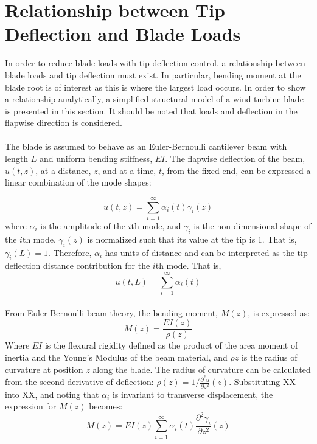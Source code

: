 \section{Relationship between Tip Deflection and Blade Loads}
In order to reduce blade loads with tip deflection control, a relationship between blade loads and tip deflection must exist. In particular, bending moment at the blade root is of interest as this is where the largest load occurs. In order to show a relationship analytically, a simplified structural model of a wind turbine blade is presented in this section. It should be noted that loads and deflection in the flapwise direction is considered. 
\\~\\
The blade is assumed to behave as an Euler-Bernoulli cantilever beam with length $L$ and uniform bending stiffness, $EI$. The flapwise deflection of the beam, $u(t, z)$, at a distance, $z$, and at a time, $t$, from the fixed end, can be expressed a linear combination of the mode shapes:

\begin{equation}
    u(t, z) = \sum_{i=1}^\infty \alpha_i(t) \gamma_i(z)
\end{equation}
where $\alpha_i$ is the amplitude of the $i$th mode, and $\gamma_i$ is the non-dimensional shape of the $i$th mode. $\gamma_i(z)$ is normalized such that its value at the tip is 1. That is, $\gamma_i(L) = 1$. Therefore, $\alpha_i$ has units of distance and can be interpreted as the tip deflection distance contribution for the $i$th mode. That is,
\begin{equation}
    u(t, L) = \sum_{i=1}^\infty \alpha_i(t)
\end{equation}
\\
From Euler-Bernoulli beam theory, the bending moment, $M(z)$, is expressed as:
\begin{equation}
    M(z) = \frac{EI(z)}{\rho(z)}
\end{equation}
Where $EI$ is the flexural rigidity defined as the product of the area moment of inertia and the Young's Modulus of the beam material, and $\rho{z}$ is the radius of curvature at position $z$ along the blade. The radius of curvature can be calculated from the second derivative of deflection: $\rho(z) = 1/\frac{\partial ^2 u}{\partial z^2}(z)$. Substituting XX into XX, and noting that $\alpha_i$ is invariant to transverse displacement, the expression for $M(z)$ becomes:
\begin{equation}
    M(z) = EI(z)\sum_{i=1}^\infty \alpha_i(t)\frac{\partial ^2 \gamma_i}{\partial z^2}(z)
\end{equation}
     
